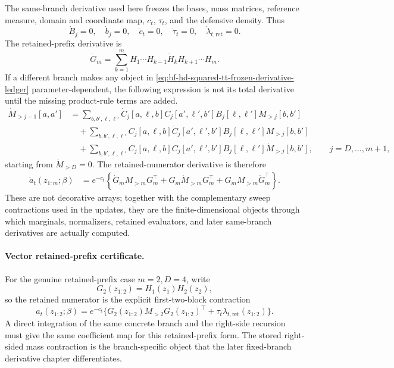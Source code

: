 The same-branch derivative used here freezes the bases, mass matrices, reference
measure, domain and coordinate map, \(c_t\), \(\tau_t\), and the defensive
density.  Thus
\begin{equation}
  \dot B_j=0,
  \quad \dot b_j=0,
  \quad \dot c_t=0,
  \quad \dot\tau_t=0,
  \quad \dot\lambda_{t,\mathrm{ret}}=0.
  \label{eq:bf-hd-squared-tt-frozen-derivative-ledger}
\end{equation}
The retained-prefix derivative is
\begin{equation}
  \dot G_m
  =
  \sum_{k=1}^{m}
  H_1\cdots H_{k-1}\dot H_kH_{k+1}\cdots H_m.
  \label{eq:bf-hd-squared-tt-dot-retained-prefix}
\end{equation}
If a different branch makes any object in
\eqref{eq:bf-hd-squared-tt-frozen-derivative-ledger} parameter-dependent, the
following expression is not its total derivative until the missing product-rule
terms are added.
\begin{equation}
\begin{aligned}
  \dot M_{>j-1}[a,a']
  &=
  \sum_{b,b',\ell,\ell'}
  \dot C_j[a,\ell,b]
  C_j[a',\ell',b']
  B_j[\ell,\ell']
  M_{>j}[b,b']\\
  &\quad+
  \sum_{b,b',\ell,\ell'}
  C_j[a,\ell,b]
  \dot C_j[a',\ell',b']
  B_j[\ell,\ell']
  M_{>j}[b,b']\\
  &\quad+
  \sum_{b,b',\ell,\ell'}
  C_j[a,\ell,b]
  C_j[a',\ell',b']
  B_j[\ell,\ell']
  \dot M_{>j}[b,b'],
  \qquad j=D,\ldots,m+1,
  \label{eq:bf-hd-squared-tt-dot-right-mass-recursion}
\end{aligned}
\end{equation}
starting from \(\dot M_{>D}=0\).  The retained-numerator derivative is therefore
\begin{equation}
\begin{aligned}
  \dot a_t(z_{1:m};\beta)
  &=
  e^{-c_t}\left\{
    \dot G_m M_{>m}G_m^\top
    +G_m\dot M_{>m}G_m^\top
    +G_mM_{>m}\dot G_m^\top
  \right\}.
  \label{eq:bf-hd-squared-tt-dot-retained-numerator}
\end{aligned}
\end{equation}
These are not decorative arrays; together with the complementary sweep
contractions used in the updates, they are the finite-dimensional objects through
which marginals, normalizers, retained evaluators, and later same-branch
derivatives are actually computed.

\paragraph{Vector retained-prefix certificate.}
For the genuine retained-prefix case \(m=2,D=4\), write
\[
  G_2(z_{1:2})=H_1(z_1)H_2(z_2),
\]
so the retained numerator is the explicit first-two-block contraction
\[
  a_t(z_{1:2};\beta)
  =e^{-c_t}\{G_2(z_{1:2})M_{>2}G_2(z_{1:2})^\top
  +\tau_t\lambda_{t,\mathrm{ret}}(z_{1:2})\}.
\]
A direct integration of the same concrete branch and the right-side recursion must
give the same coefficient map for this retained-prefix form.  The stored
right-sided mass contraction is the branch-specific object that the later
fixed-branch derivative chapter differentiates.

